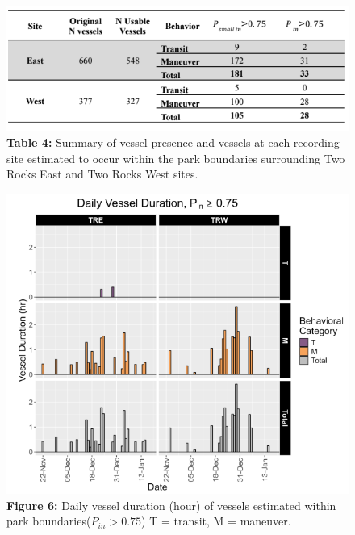 \documentclass[
  letterpaper,
  oneside,
  open=any]{scrbook}
\begin{document}
\begin{figure}[H]

{\centering \includegraphics{images/Table.4.PNG}

}

\caption{\textbf{Table 4:} Summary of vessel presence and vessels at
each recording site estimated to occur within the park boundaries
surrounding Two Rocks East and Two Rocks West sites.}

\end{figure}%
\begin{figure}[H]

{\centering \includegraphics{images/Figure.6.PNG}

}

\caption{\textbf{Figure 6:} Daily vessel duration (hour) of vessels
estimated within park boundaries(\(P_{in} > 0.75\)) T = transit, M =
maneuver.}

\end{figure}%
\end{document}
